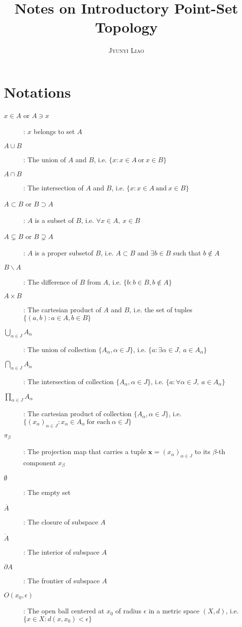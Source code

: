 \documentclass{article}
\title{\bf Notes on Introductory Point-Set Topology}
\author{\textsc{Jyunyi Liao}}
\date{}
\numberwithin{equation}{section}
\theoremstyle{plain}
\theoremstyle{definition}
\begin{document}
\maketitle
\tableofcontents

\newpage
\setcounter{section}{-1}
\section{Notations}
\begin{description}
	\item[$x\in A$ or $A\ni x$]: $x$ belongs to set $A$
	\item[$A\cup B$]: The union of $A$ and $B$, i.e. $\{x:x\in A\ \text{or}\ x\in B\}$
	\item[$A\cap B$]: The intersection of $A$ and $B$, i.e. $\{x:x\in A\ \text{and}\ x\in B\}$
	\item[$A \subset B$ or $B \supset A$]: $A$ is a subset of $B$, i.e. $\forall x\in A,\ x\in B$
	\item[$A \subsetneq B$ or $B \supsetneq A$]: $A$ is a proper subsetof $B$, i.e. $A\subset B$ and $\exists b\in B$ such that $b\notin A$
	\item[$B\backslash A$]: The difference of $B$ from $A$, i.e. $\{b:b\in B,b\notin A\}$ 
	\item[$A\times B$]: The cartesian product of $A$ and $B$, i.e. the set of tuples $\{(a,b):a\in A,b\in B\}$
	\item[$\bigcup_{\alpha\in J}A_\alpha$]: The union of collection $\{A_\alpha,\alpha\in J\}$, i.e. $\{a:\exists\alpha\in J,\ a\in A_\alpha\}$
	\item[$\bigcap_{\alpha\in J}A_\alpha$]: The intersection of collection $\{A_\alpha,\alpha\in J\}$, i.e. $\{a:\forall\alpha\in J,\ a\in A_\alpha\}$
	\item[$\prod_{\alpha\in J}A_\alpha$]: The cartesian product of collection $\{A_\alpha,\alpha\in J\}$, i.e. $\{(x_\alpha)_{\alpha\in J}: x_\alpha\in A_\alpha\ \text{for each}\ \alpha\in J\}$
	\item[$\pi_\beta$]: The projection map that carries a tuple $\mathbf{x}=(x_\alpha)_{\alpha\in J}$ to its $\beta$-th component $x_\beta$
	\item[$\emptyset$]: The empty set
	\item[$\overline{A}$]: The closure of subspace $A$
	\item[$\mathring{A}$]: The interior of subspace $A$
	\item[$\partial A$]: The frontier of subspace $A$
	\item[$O(x_0,\epsilon)$]: The open ball centered at $x_0$ of radius $\epsilon$ in a metric space $(X,d)$, i.e. $\{x\in X:d(x,x_0)<\epsilon\}$

\end{description}
\end{document}
